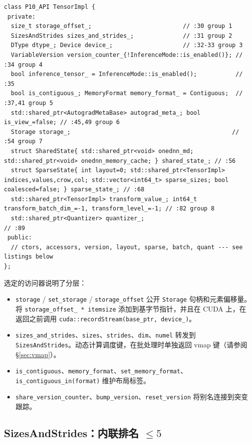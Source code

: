 \begin{lstlisting}[caption={eight groups in one class.}, label=lst:tensorimplfull]
class P10_API TensorImpl {
 private:
  size_t storage_offset_;                          // :30 group 1
  SizesAndStrides sizes_and_strides_;              // :31 group 2
  DType dtype_; Device device_;                    // :32-33 group 3
  VariableVersion version_counter_{!InferenceMode::is_enabled()}; // :34 group 4
  bool inference_tensor_ = InferenceMode::is_enabled();           // :35
  bool is_contiguous_; MemoryFormat memory_format_ = Contiguous;  // :37,41 group 5
  std::shared_ptr<AutogradMetaBase> autograd_meta_; bool is_view_=false; // :45,49 group 6
  Storage storage_;                                              // :54 group 7
  struct SharedState{ std::shared_ptr<void> onednn_md; std::shared_ptr<void> onednn_memory_cache; } shared_state_; // :56
  struct SparseState{ int layout=0; std::shared_ptr<TensorImpl> indices,values,crow,col; std::vector<int64_t> sparse_sizes; bool coalesced=false; } sparse_state_; // :68
  std::shared_ptr<TensorImpl> transform_value_; int64_t transform_batch_dim_=-1, transform_level_=-1; // :82 group 8
  std::shared_ptr<Quantizer> quantizer_;                                         // :89
 public:
  // ctors, accessors, version, layout, sparse, batch, quant --- see listings below
};
\end{lstlisting}

选定的访问器说明了分层：

\begin{itemize}[leftmargin=1.2em]
\item \texttt{storage} / \texttt{set\_storage} / \texttt{storage\_offset} 公开 \texttt{Storage} 句柄和元素偏移量。将 \texttt{storage\_offset\_ * itemsize} 添加到基字节指针，并且在 CUDA 上，在返回之前调用 \texttt{cuda::recordStream(base\_ptr, device\_)}。
\item \texttt{sizes\_and\_strides}、\texttt{sizes}、\texttt{strides}、\texttt{dim}、\texttt{numel} 转发到 \texttt{SizesAndStrides}。动态计算调度键，在批处理时单独返回 vmap 键（请参阅 \S\ref{sec:vmap}）。
\item \texttt{is\_contiguous}、\texttt{memory\_format}、\texttt{set\_memory\_format}、\texttt{is\_contiguous\_in(format)} 维护布局标签。
\item \texttt{share\_version\_counter}、\texttt{bump\_version}、\texttt{reset\_version} 将别名连接到突变跟踪。
\end{itemize}

\subsection{SizesAndStrides：内联排名 $\le 5$}
\label{sec:sizesstrides}

